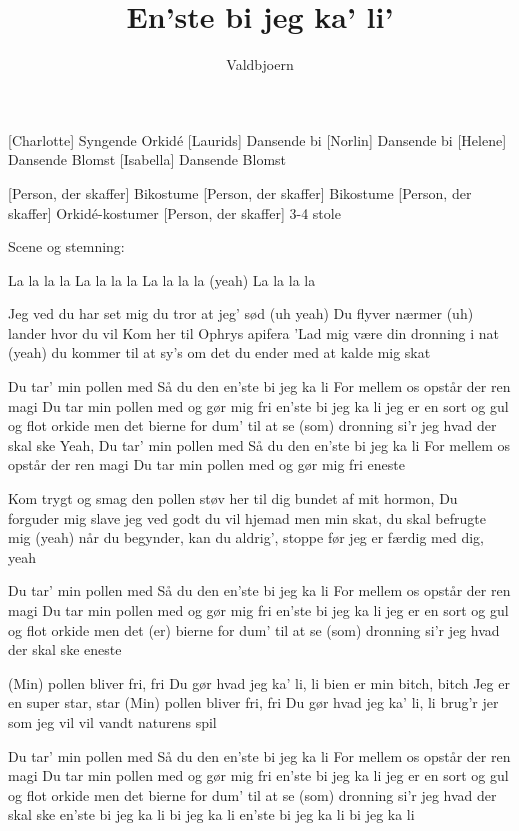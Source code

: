 \documentclass[a4paper,11pt]{article}
\title{En'ste bi jeg ka' li'}
\author{Valdbjoern}
\begin{document}
\maketitle

\begin{roles}
    [Charlotte] Syngende Orkidé
    [Laurids] Dansende bi
    [Norlin] Dansende bi
    [Helene] Dansende Blomst
    [Isabella] Dansende Blomst
\end{roles}

\begin{props}
    [Person, der skaffer] Bikostume
    [Person, der skaffer] Bikostume
    [Person, der skaffer] Orkidé-kostumer 
    [Person, der skaffer] 3-4 stole
\end{props}

Scene og stemning:


\begin{song}

La la la la
La la la la
La la la la (yeah)
La la la la

Jeg ved du har set mig
du tror at jeg’ sød (uh yeah)
Du flyver nærmer (uh)
lander hvor du vil
Kom her til Ophrys apifera 
'Lad mig være din dronning i nat
(yeah)
du kommer til at sy’s om det
du ender med at kalde mig skat

Du tar’ min pollen med
Så du den en'ste bi jeg ka li
For mellem os opstår der ren magi
Du tar min pollen med og gør mig fri
en'ste bi jeg ka li
jeg er en sort og gul og flot orkide
men det bierne for dum’ til at se
(som) dronning si’r jeg hvad der skal ske
Yeah,
Du tar’ min pollen med
Så du den en'ste bi jeg ka li
For mellem os opstår der ren magi
Du tar min pollen med og gør mig fri
eneste

Kom trygt og smag den
pollen støv her til dig
bundet af mit hormon,
Du forguder mig
slave jeg ved godt du vil hjemad 
men min skat, du skal befrugte mig
(yeah)
når du begynder, kan du aldrig',
stoppe før jeg er færdig med dig, yeah

Du tar’ min pollen med
Så du den en'ste bi jeg ka li
For mellem os opstår der ren magi
Du tar min pollen med og gør mig fri
en'ste bi jeg ka li
jeg er en sort og gul og flot orkide
men det (er) bierne for dum’ til at se
(som) dronning si’r jeg hvad der skal ske
eneste

(Min) pollen bliver fri, fri
Du gør hvad jeg ka’ li, li
bien er min bitch, bitch
Jeg er en super star, star
(Min) pollen bliver fri, fri
Du gør hvad jeg ka’ li, li
brug'r jer som jeg vil vil
vandt naturens spil

Du tar’ min pollen med
Så du den en'ste bi jeg ka li
For mellem os opstår der ren magi
Du tar min pollen med og gør mig fri
en'ste bi jeg ka li
jeg er en sort og gul og flot orkide
men det bierne for dum’ til at se
(som) dronning si’r jeg hvad der skal ske
en'ste bi jeg ka li
bi jeg ka li
en'ste bi jeg ka li
bi jeg ka li

\end{song}
\end{document}
